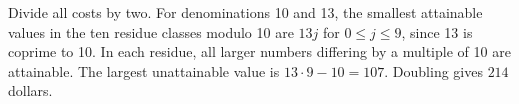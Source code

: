 Divide all costs by two. For denominations 10 and 13, the smallest attainable values in the ten residue classes modulo 10 are $13j$ for $0\le j\le9$, since 13 is coprime to 10. In each residue, all larger numbers differing by a multiple of 10 are attainable. The largest unattainable value is $13\cdot9-10=107$. Doubling gives $\boxed{214}$ dollars.
